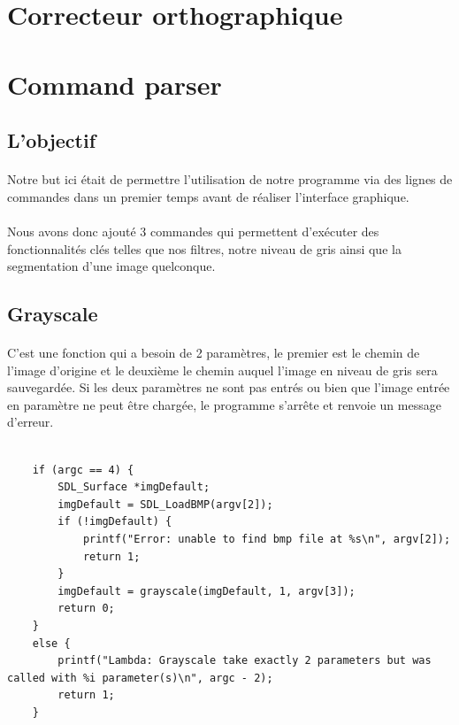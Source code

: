 \documentclass{article}
\begin{document}
\newpage
{}
\section{Correcteur orthographique}

\newpage
{}
\section{Command parser}

\subsection{L'objectif}

\paragraph{}Notre but ici était de permettre l'utilisation de notre programme via des lignes de commandes dans un premier temps avant de réaliser l'interface graphique.

\paragraph{}Nous avons donc ajouté 3 commandes qui permettent d'exécuter des fonctionnalités clés telles que nos filtres, notre niveau de gris ainsi que la segmentation d'une image quelconque.

\subsection{Grayscale}

\paragraph{}C'est une fonction qui a besoin de 2 paramètres, le premier est le chemin de l'image d'origine et le deuxième le chemin auquel l'image en niveau de gris sera sauvegardée. Si les deux paramètres ne sont pas entrés ou bien que l'image entrée en paramètre ne peut être chargée, le programme s'arrête et renvoie un message d'erreur.

\begin{lstlisting}

	if (argc == 4) {
		SDL_Surface *imgDefault;
		imgDefault = SDL_LoadBMP(argv[2]);
		if (!imgDefault) {
			printf("Error: unable to find bmp file at %s\n", argv[2]);
			return 1;
		}
		imgDefault = grayscale(imgDefault, 1, argv[3]);
		return 0;
	}
	else {
		printf("Lambda: Grayscale take exactly 2 parameters but was called with %i parameter(s)\n", argc - 2);
		return 1;
	}
\end{lstlisting}
\end{document}
